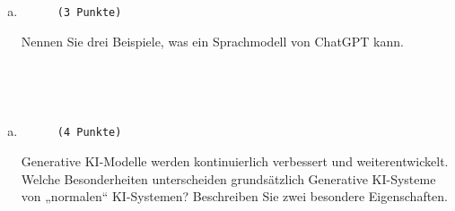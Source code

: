 \documentclass[12pt, ngerman]{AssignmentClass}
\begin{document}
    \begin{enumerate}[b)]
		\item 
			\begin{minipage}[t]{\linewidth}
				\vspace{-0.61em}
				\begin{figure} 
					\raggedleft
					\texttt{(3 Punkte)}
				\end{figure}
                Nennen Sie drei Beispiele, was ein Sprachmodell von ChatGPT kann.
			\end{minipage}
	\end{enumerate}
 
	\begin{solution}
		\noindent
		\\
	\end{solution}

    \begin{answerbox}
		\noindent
		\fbox{\parbox[c]{\textwidth}{
				\vspace{5cm}
				\hspace{\textwidth}
		}}\\
	\end{answerbox}

    \newpage

    \begin{enumerate}[c)]
		\item 
			\begin{minipage}[t]{\linewidth}
				\vspace{-0.61em}
				\begin{figure} 
					\raggedleft
					\texttt{(4 Punkte)}
				\end{figure}
                Generative KI-Modelle werden kontinuierlich verbessert und weiterentwickelt. Welche Besonderheiten unterscheiden grundsätzlich Generative KI-Systeme von „normalen“ KI-Systemen? Beschreiben Sie zwei besondere Eigenschaften.
			\end{minipage}
	\end{enumerate}
 
\end{document}
